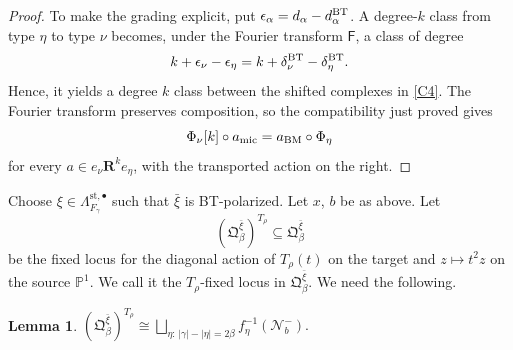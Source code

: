 \documentclass[11pt,reqno]{amsart}
\newtheorem{Lemma}[Theorem]{Lemma}
\theoremstyle{definition}
\theoremstyle{remark}
\def\calN{\mathcal N}
\def\bR{\mathbf R}
\begin{document}
\begin{proof}
To make the grading explicit, put
$\epsilon_\alpha=d_\alpha-d_\alpha^{\rm BT}$.
A degree-$k$ class from type $\eta$ to type $\nu$ becomes,
under the Fourier transform $\mathsf F$, a class of degree
$$k+\epsilon_\nu-\epsilon_\eta=k+\delta_\nu^{\rm BT}-\delta_\eta^{\rm BT}.$$
Hence, it yields a degree $k$ class between the shifted complexes in
\eqref{C4}. The Fourier transform preserves composition, so the
compatibility just proved gives
\[
 \Phi_\nu[k]\circ a_{\rm mic}
   =a_{\rm BM}\circ\Phi_\eta
\]
for every $a\in e_\nu\bR^k e_\eta$, with the transported action on
the right. 
\end{proof}

Choose $\xi\in\Lambda_{F_\gamma}^{\mathrm{st},\bullet}$ such that
$\bar\xi$ is BT-polarized. Let $x$, $b$ be as above. 
Let 
$$(\mathfrak Q_\beta^{\bar\xi})^{T_\rho}\subseteq\mathfrak Q_\beta^{\bar\xi}$$ be the fixed locus
for the diagonal action of $T_\rho(t)$ on the target
and $z\mapsto t^2z$ on the source $\mathbb P^1$.
We call it the $T_\rho$-fixed locus in $\mathfrak Q_\beta^{\bar\xi}$.
We need the following.

\begin{Lemma}\label{lem:fixed locus}
$(\mathfrak Q_\beta^{\bar\xi})^{T_\rho}
 \cong\bigsqcup_{\eta:\,|\gamma|-|\eta|=2\beta} f_\eta^{-1}(\calN_b^-).$
\end{Lemma}
\end{document}
